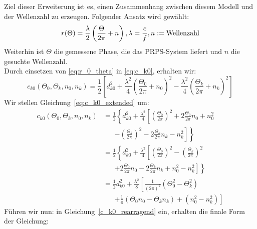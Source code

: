 %
Ziel dieser Erweiterung ist es, einen Zusammenhang zwischen diesem Modell und der Wellenzahl zu erzeugen. Folgender Ansatz wird gewählt:
	\begin{equation}\label{eq:r_0_theta} r(\Theta)=\frac{\lambda}{2}\left(\frac{\Theta}{2\pi}+n\right),\\\lambda=\frac{c}{f}, n:= \text{Wellenzahl}
\end{equation}
%
%
Weiterhin ist $\Theta$ die gemessene Phase, die das PRPS-System liefert und $n$ die gesuchte Wellenzahl.\\
Durch einsetzen von \eqref{eq:r_0_theta} in \eqref{eq:c_k0}, erhalten wir:
\begin{equation}\label{eq:c_k0_extended}
	c_{k0}(\Theta_0, \Theta_k, n_0, n_k) =\frac{1}{2}\left[d_{k0}^2+\frac{\lambda^2}{4}\left(\frac{\Theta_0}{2\pi}+n_0\right)^2-\frac{\lambda^2}{4}\left(\frac{\Theta_k}{2\pi}+n_k\right)^2\right]
\end{equation}
%
Wir stellen Gleichung~\eqref{eq:c_k0_extended} um:
\begin{align}
%	
	c_{k0}(\Theta_0, \Theta_k, n_0, n_k) &= \frac{1}{2}\left\{d_{k0}^2+\frac{\lambda^2}{4}\left[\left(\frac{\Theta_0}{2\pi}\right)^2+2\frac{\Theta_0}{2\pi}n_0+n_0^2 \right.\right.\nonumber\\
	&\phantom{=}\; 
	\left.\left.-\left(\frac{\Theta_k}{2\pi}\right)^2-2\frac{\Theta_k}{2\pi}n_k-n_k^2\right]\right\}\\
%    
    &=\frac{1}{2}\left\{d_{k0}^2+\frac{\lambda^2}{4}\left[\left(\frac{\Theta_0}{2\pi}\right)^2-\left(\frac{\Theta_k}{2\pi}\right)^2 \right.\right.\nonumber\\
    &\phantom{=}\;
   	\left.\left.+2\frac{\Theta_0}{2\pi}n_0-2\frac{\Theta_k}{2\pi}n_k+n_0^2-n_k^2\right]\right\}\\
%	
	&=\frac{1}{2}d_{k0}^2+\frac{\lambda^2}{8}\left[\frac{1}{(2\pi)^2}\left(\Theta_0^2-\Theta_k^2\right) \right.\nonumber\\
	&\phantom{=}\;
	\left. +\frac{1}{\pi}\left(\Theta_0n_0-\Theta_kn_k\right)+\left(n_0^2-n_k^2\right)\right]\label{c_k0_rearragend}
\end{align}
%
Führen wir nun:
%
in Gleichung~\eqref{c_k0_rearragend} ein, erhalten die finale Form der Gleichung:
